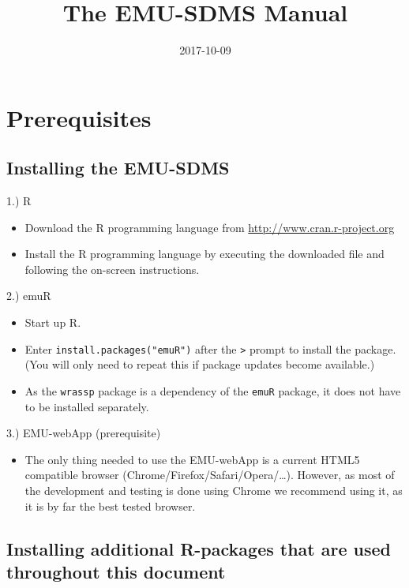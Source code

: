 \documentclass[]{book}
\title{The EMU-SDMS Manual}
\author{}
\date{2017-10-09}
\providecommand{\tightlist}{%
  \setlength{\itemsep}{0pt}\setlength{\parskip}{0pt}}
\theoremstyle{definition}
\theoremstyle{definition}
\theoremstyle{definition}
\theoremstyle{remark}
\begin{document}
\maketitle

{
\setcounter{tocdepth}{1}
\tableofcontents
}
\chapter{Prerequisites}\label{prerequisites}

\section{Installing the EMU-SDMS}\label{installing-the-emu-sdms}

1.) R

\begin{itemize}
\tightlist
\item
  Download the R programming language from
  \href{www.cran.r-project.org}{http://www.cran.r-project.org}
\item
  Install the R programming language by executing the downloaded file
  and following the on-screen instructions.
\end{itemize}

2.) emuR

\begin{itemize}
\tightlist
\item
  Start up R.
\item
  Enter \texttt{install.packages("emuR")} after the
  \texttt{\textgreater{}} prompt to install the package. (You will only
  need to repeat this if package updates become available.)
\item
  As the \texttt{wrassp} package is a dependency of the \texttt{emuR}
  package, it does not have to be installed separately.
\end{itemize}

3.) EMU-webApp (prerequisite)

\begin{itemize}
\tightlist
\item
  The only thing needed to use the EMU-webApp is a current HTML5
  compatible browser (Chrome/Firefox/Safari/Opera/\ldots{}). However, as
  most of the development and testing is done using Chrome we recommend
  using it, as it is by far the best tested browser.
\end{itemize}

\section{Installing additional R-packages that are used throughout this
document}\label{installing-additional-r-packages-that-are-used-throughout-this-document}
\end{document}
